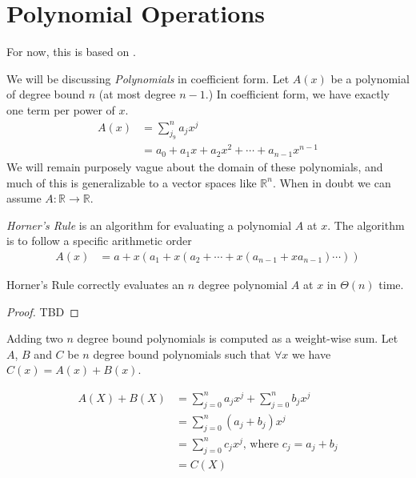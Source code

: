 \section{Polynomial Operations}
For now, this is based on \cite{Chowdhury2023Lecture4}.

\begin{definition}
  We will be discussing \textit{Polynomials} in coefficient form. 
  Let $A(x)$ be a polynomial of degree bound $n$ (at most degree $n - 1$.)
  In coefficient form, we have exactly one term per power of $x$.
  \begin{align*}
    A(x) &= \sum_{j_9}^n a_j x^j \\
         &= a_0 + a_1x + a_2 x^2 + \cdots + a_{n - 1}x^{n - 1}
  \end{align*}
  We will remain purposely vague about the domain of these polynomials,
  and much of this is generalizable to a vector spaces like $\mathbb{R}^n$.
  When in doubt we can assume $A: \mathbb{R} \rightarrow \mathbb{R}$.
\end{definition}

\begin{definition}
  \textit{Horner's Rule} is an algorithm for evaluating a polynomial $A$ at $x$.
  The algorithm is to follow a specific arithmetic order
  \begin{align*}
    A(x) &= a + x (a_1 + x (a_2 + \cdots + x ( a_{n - 1} + x a_{n - 1})\cdots ))
  \end{align*} 
\end{definition}

\begin{theorem}
Horner's Rule correctly evaluates an $n$ degree polynomial $A$ at $x$ in $\Theta(n)$ time.
\end{theorem}

\begin{proof}
TBD
\end{proof}

\begin{lemma}
Adding two $n$ degree bound polynomials is computed as a weight-wise sum. 
Let $A$, $B$ and $C$ be $n$ degree bound polynomials such that $\forall x$ we have $C(x) = A(x) + B(x)$.

\begin{align*}
  A(X) + B(X) &= \sum_{j=0}^n a_j x^j + \sum_{j=0}^n b_j x^j \\
              &= \sum_{j=0}^n (a_j + b_j) x^j \\
              &= \sum_{j=0}^n c_j x^j \text{, where } c_j = a_j + b_j \\
              &= C(X)
\end{align*}
\end{lemma}


